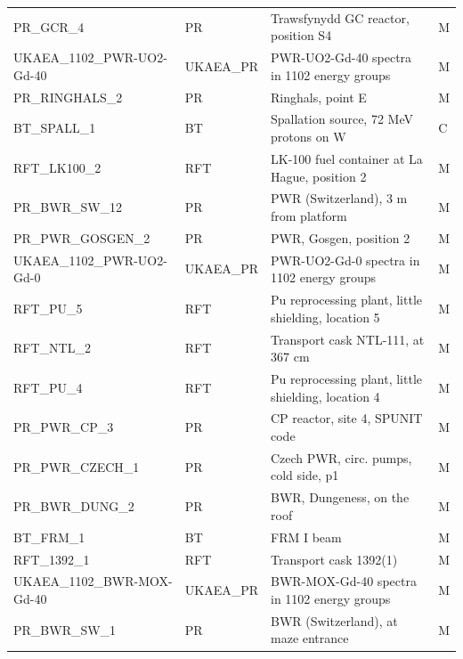 \documentclass[a4paper, 12pt]{article}
\begin{document}
\begin{appendices}
\begin{longtable}{llll}
PR\_GCR\_4 & PR & Trawsfynydd GC reactor, position S4  & M\\
UKAEA\_1102\_PWR-UO2-Gd-40 & UKAEA\_PR & PWR-UO2-Gd-40 spectra in 1102 energy groups & M\\
PR\_RINGHALS\_2 & PR & Ringhals, point E  & M\\
BT\_SPALL\_1 & BT & Spallation source, 72 MeV protons on W  & C\\
RFT\_LK100\_2 & RFT & LK-100 fuel container at La Hague, position 2  & M\\
PR\_BWR\_SW\_12 & PR & PWR (Switzerland), 3 m from platform  & M\\
PR\_PWR\_GOSGEN\_2 & PR & PWR, Gosgen, position 2  & M\\
UKAEA\_1102\_PWR-UO2-Gd-0 & UKAEA\_PR & PWR-UO2-Gd-0 spectra in 1102 energy groups & M\\
RFT\_PU\_5 & RFT & Pu reprocessing plant, little shielding, location 5  & M\\
RFT\_NTL\_2 & RFT & Transport cask NTL-111, at 367 cm  & M\\
RFT\_PU\_4 & RFT & Pu reprocessing plant, little shielding, location 4  & M\\
PR\_PWR\_CP\_3 & PR & CP reactor, site 4, SPUNIT code  & M\\
PR\_PWR\_CZECH\_1 & PR & Czech PWR, circ. pumps, cold side, p1  & M\\
PR\_BWR\_DUNG\_2 & PR & BWR, Dungeness, on the roof  & M\\
BT\_FRM\_1 & BT & FRM I beam  & M\\
RFT\_1392\_1 & RFT & Transport cask 1392(1)  & M\\
UKAEA\_1102\_BWR-MOX-Gd-40 & UKAEA\_PR & BWR-MOX-Gd-40 spectra in 1102 energy groups & M\\
PR\_BWR\_SW\_1 & PR & BWR (Switzerland), at maze entrance  & M
\end{longtable}


\end{appendices}
\end{document}
